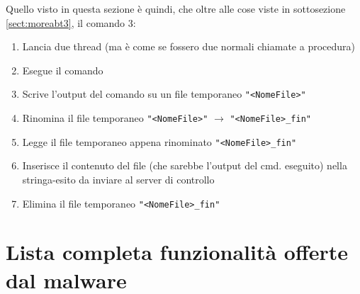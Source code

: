 \documentclass[
    a4paper, %
    11pt %
]{article}
\begin{document}
            Quello visto in questa sezione è quindi, che oltre alle cose viste in sottosezione 
            \ref{sect:moreabt3}, il comando 3:
            \begin{enumerate}
                \item Lancia due thread (ma è come se fossero due normali chiamate a procedura)
                \item Esegue il comando
                \item Scrive l'output del comando su un file temporaneo \texttt{"<NomeFile>"}
                \item Rinomina il file temporaneo \texttt{"<NomeFile>"} $\rightarrow$ \texttt{"<NomeFile>\_fin"}
                \item Legge il file temporaneo appena rinominato \texttt{"<NomeFile>\_fin"}
                \item Inserisce il contenuto del file (che sarebbe l'output del cmd. eseguito) nella stringa-esito da inviare al server di controllo
                \item Elimina il file temporaneo \texttt{"<NomeFile>\_fin"}
            \end{enumerate}
        
        \section{Lista completa funzionalità offerte dal malware}
\end{document}
